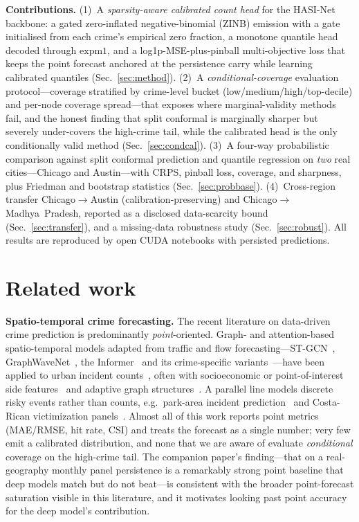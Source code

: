 \documentclass[11pt,conference]{IEEEtran}
\begin{document}
\textbf{Contributions.} (1)~A \emph{sparsity-aware calibrated count head} for the
HASI-Net backbone: a gated zero-inflated negative-binomial (ZINB) emission with a
gate initialised from each crime's empirical zero fraction, a monotone quantile
head decoded through $\mathrm{expm1}$, and a log1p-MSE-plus-pinball
multi-objective loss that keeps the point forecast anchored at the persistence
carry while learning calibrated quantiles (Sec.~\ref{sec:method}). (2)~A
\emph{conditional-coverage} evaluation protocol---coverage stratified by
crime-level bucket (low/medium/high/top-decile) and per-node coverage
spread---that exposes where marginal-validity methods fail, and the honest
finding that split conformal is marginally sharper but severely under-covers the
high-crime tail, while the calibrated head is the only conditionally valid method
(Sec.~\ref{sec:condcal}). (3)~A four-way probabilistic comparison against split
conformal prediction and quantile regression on \emph{two} real cities---Chicago
and Austin---with CRPS, pinball loss, coverage, and sharpness, plus Friedman and
bootstrap statistics (Sec.~\ref{sec:probbase}). (4)~Cross-region transfer
Chicago$\to$Austin (calibration-preserving) and Chicago$\to$Madhya~Pradesh,
reported as a disclosed data-scarcity bound (Sec.~\ref{sec:transfer}), and a
missing-data robustness study (Sec.~\ref{sec:robust}). All results are reproduced
by open CUDA notebooks with persisted predictions.

\section{Related work}\label{sec:related}
\textbf{Spatio-temporal crime forecasting.} The recent literature on data-driven
crime prediction is predominantly \emph{point}-oriented. Graph- and
attention-based spatio-temporal models adapted from traffic and flow
forecasting---ST-GCN~\cite{yu2018stgcn}, GraphWaveNet~\cite{wu2019graphwavenet},
the Informer~\cite{zhou2021informer} and its crime-specific
variants~\cite{fan2025informer}---have been applied to urban incident
counts~\cite{deng2023crimerisk,wang2023stgnn,mao2025cnnlstm}, often with
socioeconomic or point-of-interest side features~\cite{sui2024gat,qin2025acsaformer}
and adaptive graph structures~\cite{wang2025mragnn,shan2025adagnclstm}. A
parallel line models discrete risky events rather than counts, e.g.\ park-area
incident prediction~\cite{hakyemez2023parkevents} and Costa-Rican victimization
panels~\cite{solis2024costarica}. Almost all of this work reports point metrics
(MAE/RMSE, hit rate, CSI) and treats the forecast as a single number; very few
emit a calibrated distribution, and none that we are aware of evaluate
\emph{conditional} coverage on the high-crime tail. The companion paper's
finding---that on a real-geography monthly panel persistence is a remarkably
strong point baseline that deep models match but do not beat---is consistent
with the broader point-forecast saturation visible in this literature, and it
motivates looking past point accuracy for the deep model's contribution.
\end{document}
